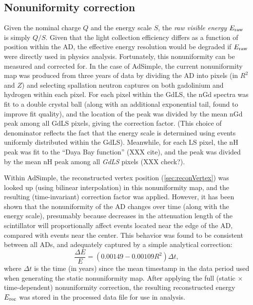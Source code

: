 \documentclass[../thesis.tex]{subfiles}
\begin{document}
\subsection{Nonuniformity correction}
\label{sec:reconEnergyNU}

Given the nominal charge $Q$ and the energy scale $S$, the \emph{raw visible
  energy} $E_\mathrm{raw}$ is simply $Q/S$. Given that the light collection efficiency
differs as a function of position within the AD, the effective energy resolution
would be degraded if $E_\mathrm{raw}$ were directly used in physics
analysis. Fortunately, this nonuniformity can be measured and corrected for. In
the case of AdSimple, the current nonuniformity map was produced from three
years of data by dividing the AD into pixels (in $R^2$ and $Z$) and selecting
spallation neutron captures on both gadolinium and hydrogen within each
pixel. For each pixel within the GdLS, the nGd spectra was fit to a double
crystal ball (along with an additional exponential tail, found to improve fit
quality), and the location of the peak was divided by the mean nGd peak among
all GdLS pixels, giving the correction factor. (This choice of denominator
reflects the fact that the energy scale is determined using events uniformly
distributed within the GdLS). Meanwhile, for each LS pixel, the nH peak was fit
to the ``Daya Bay function'' (XXX cite), and the peak was divided by the mean nH
peak among all \emph{GdLS} pixels (XXX check?).

Within AdSimple, the reconstructed vertex position (\autoref{sec:reconVertex})
was looked up (using bilinear interpolation) in this nonuniformity map, and the
resulting (time-invariant) correction factor was applied. However, it has been
shown that the nonuniformity of the AD changes over time (along with the energy
scale), presumably because decreases in the attenuation length of the
scintillator will proportionally affect events located near the edge of the AD,
compared with events near the center. This behavior was found to be consistent
between all ADs, and adequately captured by a simple analytical correction:
\begin{equation*}
  \frac{\Delta E}{E} = (0.00149 - 0.00109 R^2) \Delta t,
\end{equation*}
where $\Delta t$ is the time (in years) since the mean timestamp in the data
period used when generating the static nonuniformity map. After applying the
full (static $\times$ time-dependent) nonuniformity correction, the resulting
reconstructed energy $E_\mathrm{rec}$ was stored in the processed data file for use in
analysis.
\end{document}
